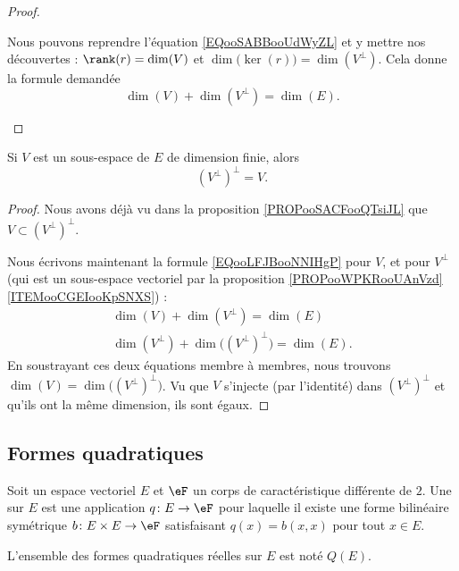 \begin{proof}
\begin{subproof}
		\spitem[Conclusion]
		Nous pouvons reprendre l'équation \eqref{EQooSABBooUdWyZL} et y mettre nos découvertes : \( \rank(r)=\dim(V)\) et \( \dim\big( \ker(r) \big)=\dim(V^{\perp})\). Cela donne la formule demandée
		\begin{equation}
			\dim(V)+\dim(V^{\perp})=\dim(E).
		\end{equation}
	\end{subproof}
\end{proof}

\begin{lemma}		\label{LEMooYYGLooYIDmoa}
	Si \( V\) est un sous-espace de \( E\) de dimension finie, alors
	\begin{equation}
		(V^{\perp})^{\perp}=V.
	\end{equation}
\end{lemma}

\begin{proof}
	Nous avons déjà vu dans la proposition \ref{PROPooSACFooQTsiJL} que \( V\subset (V^{\perp})^{\perp}\).

	Nous écrivons maintenant la formule \eqref{EQooLFJBooNNIHgP} pour \( V\), et pour \( V^{\perp}\) (qui est un sous-espace vectoriel par la proposition \ref{PROPooWPKRooUAnVzd}\ref{ITEMooCGEIooKpSNXS}) :
	\begin{subequations}
		\begin{align}
			\dim(V)+\dim(V^{\perp})=\dim(E) \\
			\dim(V^{\perp})+\dim\Big((V^{\perp})^{\perp}\Big)=\dim(E).
		\end{align}
	\end{subequations}
	En soustrayant ces deux équations membre à membres, nous trouvons \( \dim(V)=\dim\Big((V^{\perp})^{\perp}\Big)\). Vu que \( V\) s'injecte (par l'identité) dans \( (V^{\perp})^{\perp}\) et qu'ils ont la même dimension, ils sont égaux.
\end{proof}


\subsection{Formes quadratiques}

\begin{definition}   \label{DefBSIoouvuKR}
	Soit un espace vectoriel \( E\) et \( \eF\) un corps de caractéristique différente de \( 2\). Une  sur \( E\) est une application \( q\colon E\to \eF\) pour laquelle il existe une forme bilinéaire symétrique \( b\colon E\times E\to \eF\) satisfaisant \( q(x)=b(x,x)\) pour tout \( x\in E\).

	L'ensemble des formes quadratiques réelles sur \( E\) est noté \( Q(E)\).

\end{definition}

